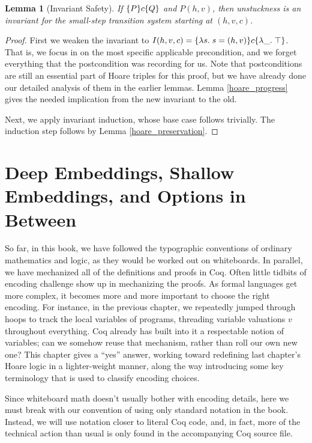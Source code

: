 \documentclass{amsbook}
\newtheorem{lemma}[theorem]{Lemma}
\theoremstyle{definition}
\theoremstyle{remark}
\numberwithin{section}{chapter}
\numberwithin{equation}{chapter}
\begin{document}
\invariants
\begin{lemma}[Invariant Safety]
  If $\{P\} c \{Q\}$ and $P(h, v)$, then unstuckness is an invariant for the small-step transition system starting at $(h, v, c)$.
\end{lemma}
\begin{proof}
  First we weaken the invariant to $I(h, v, c) = \{\lambda s. \; s = (h, v)\} c \{\lambda \_. \; \top\}$.
  That is, we focus in on the most specific applicable precondition, and we forget everything that the postcondition was recording for us.
  Note that postconditions are still an essential part of Hoare triples for this proof, but we have already done our detailed analysis of them in the earlier lemmas.
  Lemma \ref{hoare_progress} gives the needed implication from the new invariant to the old.
  
  Next, we apply invariant induction, whose base case follows trivially.
  The induction step follows by Lemma \ref{hoare_preservation}.
\end{proof}



\chapter{Deep Embeddings, Shallow Embeddings, and Options in Between}

So far, in this book, we have followed the typographic conventions of ordinary mathematics and logic, as they would be worked out on whiteboards.
In parallel, we have mechanized all of the definitions and proofs in Coq.
Often little tidbits of encoding challenge show up in mechanizing the proofs.
As formal languages get more complex, it becomes more and more important to choose the right encoding.
For instance, in the previous chapter, we repeatedly jumped through hoops to track the local variables of programs, threading variable valuations $v$ throughout everything.
Coq already has built into it a respectable notion of variables; can we somehow reuse that mechanism, rather than roll our own new one?
This chapter gives a ``yes'' answer, working toward redefining last chapter's Hoare logic in a lighter-weight manner, along the way introducing some key terminology that is used to classify encoding choices.

Since whiteboard math doesn't usually bother with encoding details, here we must break with our convention of using only standard notation in the book.
Instead, we will use notation closer to literal Coq code, and, in fact, more of the technical action than usual is only found in the accompanying Coq source file.
\end{document}
